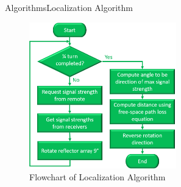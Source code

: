 \documentclass{beamer}
\begin{document}
\begin{frame}{Algorithms}{Localization Algorithm}
  \begin{figure}
    \centering
    \includegraphics[height=2.5in]{figs/img/localizationAlgoFlowchart.png}
    \caption{Flowchart of Localization Algorithm}
  \end{figure}
\end{frame}
\end{document}
